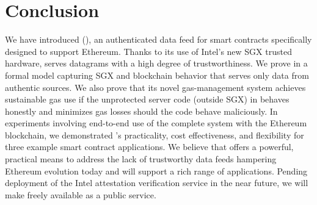 \section{Conclusion}
\label{sec:conclude}

We have introduced \tcs (\tc), an authenticated data feed for smart contracts specifically designed to support Ethereum. 
Thanks to its use of Intel's new SGX trusted hardware, \tc serves datagrams with a high degree of trustworthiness. We prove in a formal model capturing SGX and blockchain behavior that \tc serves only data from authentic sources. We also prove that its novel gas-management system achieves sustainable gas use if the unprotected server code (outside SGX) in \tc behaves honestly and minimizes gas losses should the code behave maliciously. In experiments involving end-to-end use of the complete system with the Ethereum blockchain, we demonstrated \tc's practicality, cost effectiveness, and flexibility for three example  smart contract applications. We believe that \tc offers a powerful, practical means to address the lack of trustworthy data feeds hampering Ethereum evolution today and will support a rich range of applications. Pending deployment of the Intel attestation verification service in the near future, we will make \tc freely available as a public service.
